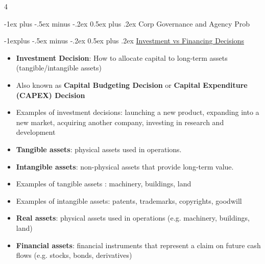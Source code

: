 \documentclass[10pt, landscape]{article}
\makeatletter
\renewcommand{\section}{\@startsection{section}{1}{0mm}%
  {-1ex plus -.5ex minus -.2ex}%
  {0.5ex plus .2ex}%
{\normalfont\large\bfseries}}
\renewcommand{\subsection}{\@startsection{subsection}{2}{0mm}%
  {-1explus -.5ex minus -.2ex}%
  {0.5ex plus .2ex}%
{\normalfont\normalsize\bfseries}}
\makeatother
\begin{document}
\raggedright
\footnotesize
\begin{multicols*}{4}
  \setlength{\columnseprule}{0.25pt}

  \begin{center}
  \end{center}

  \section{Corp Governance and Agency Prob}

  \subsection{\underline{Investment vs Financing Decisions}}

  \begin{itemize}
    \item \textbf{Investment Decision}: How to allocate capital to long-term assets (tangible/intangible assets)
    \item Also known as \textbf{Capital Budgeting Decision} or \textbf{Capital Expenditure (CAPEX) Decision}
    \item Examples of investment decisions: launching a new product, expanding into a new market, acquiring another company, investing in research and development
    \item \textbf{Tangible assets}: physical assets used in operations.
    \item \textbf{Intangible assets}: non-physical assets that provide long-term value.
    \item Examples of tangible assets : machinery, buildings, land
    \item Examples of intangible assets: patents, trademarks, copyrights, goodwill
    \item \textbf{Real assets}: physical assets used in operations (e.g. machinery, buildings, land)
    \item \textbf{Financial assets}: financial instruments that represent a claim on future cash flows (e.g. stocks, bonds, derivatives)
  \end{itemize}

  \vspace{0.2cm}


\end{multicols*}
\end{document}
